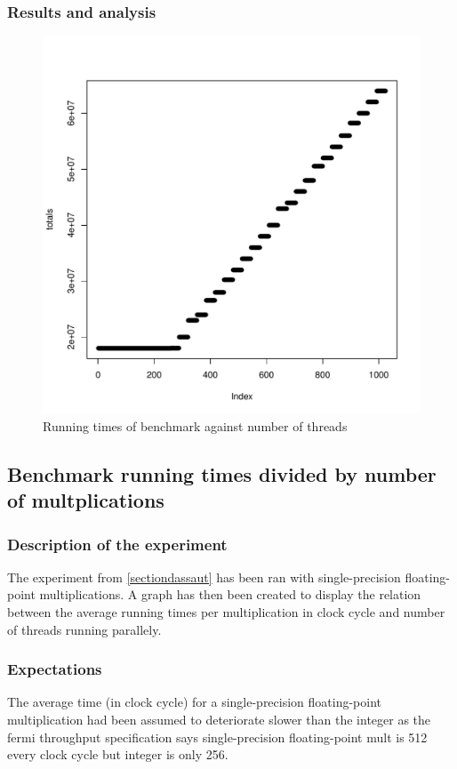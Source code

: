 \documentclass{article}
\def \scalingfactor{.8}
\begin{document}
	\subsubsection{Results and analysis}
    \begin{figure}[h]
    	\centering
		\vspace{-20pt}
	    \includegraphics[width=\scalingfactor\linewidth]{"graphics/running_times"}
		\vspace{-15pt}
        \caption{Running times of benchmark against number of threads}
    \end{figure}
	\pagebreak

	\subsection{Benchmark running times divided by number of multplications}
	\subsubsection{Description of the experiment}
	The experiment from \ref{sectiondassaut} has been ran with single-precision floating-point multiplications. A graph has then been created to display the relation between the average running times per multiplication in clock cycle and number of threads running parallely.
	\subsubsection{Expectations}
	The average time (in clock cycle) for a single-precision floating-point multiplication had been assumed to deteriorate slower than the integer as the fermi throughput specification says single-precision floating-point mult is 512 every clock cycle but integer is only 256.
\end{document}
